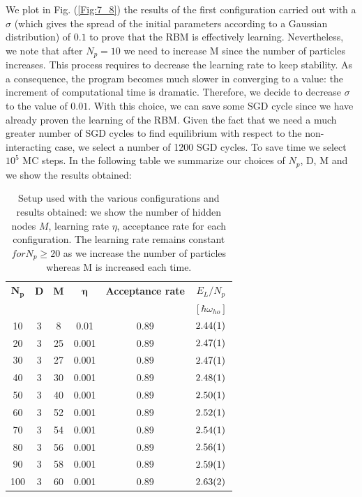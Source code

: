 We plot in Fig. (\ref{Fig:7_8}) the results of the first configuration carried out with a $\sigma$ (which gives the spread of the initial parameters according to a Gaussian distribution) of $0.1$ to prove that the RBM is effectively learning. Nevertheless, we note that after $N_p=10$ we need to increase M since the number of particles increases. This process requires to decrease the learning rate to keep stability. As a consequence, the program becomes much slower in converging to a value: the increment of computational time is dramatic. Therefore, we decide to decrease $\sigma$ to the value of $0.01$. With this choice, we can save some SGD cycle since we have already proven the learning of the RBM. Given the fact that we need a much greater number of SGD cycles to find equilibrium with respect to the non-interacting case, we select a number of 1200 SGD cycles. To save time we select $10^5$ MC steps. In the following table we summarize our choices of $N_p$, D, M and we show the results obtained: 


\begin{table}[H]
	\centering
	\caption{Setup used with the various configurations and results obtained: we show the number of hidden nodes $M$, learning rate $\eta$, acceptance rate for each configuration. The learning rate remains constant $for N_p\geq 20$ as we increase the number of particles whereas M is increased each time. }
	\begin{tabular}{c c |c c c | c} 
		$\boldsymbol{N_p}$ & \textbf{D}  & \textbf{M} & $\boldsymbol{\eta}$ & \textbf{Acceptance rate} &\textbf{$E_L/N_p$}\\  
		&&&&&$[\hbar\omega_{ho}]$\\\hline
		10 & 3 & 8 & 0.01  & 0.89 & $\SI{2.44\pm 0.01}{}$ \\
		20 & 3 & 25 & 0.001 & 0.89 & $\SI{2.47\pm 0.01}{}$\\
		30 & 3 & 27 & 0.001 & 0.89 & $\SI{2.47\pm 0.01}{}$\\
		40 & 3 & 30 & 0.001 & 0.89 & $\SI{2.48\pm 0.01}{}$\\
		50 & 3 & 40 & 0.001 & 0.89 & $\SI{2.50 \pm 0.01}{}$\\ 
		60 & 3 & 52 & 0.001 & 0.89     & $\SI{2.52 \pm 0.01}{}$               \\
		70 & 3 & 54 & 0.001 &  0.89    &       $\SI{2.54\pm0.01}{}$         \\
		80 & 3 & 56 & 0.001 &   0.89   &  $\SI{2.56\pm0.01}{}$              \\
		90 & 3 & 58 & 0.001 &    0.89  &  $\SI{2.59\pm0.01}{}$              \\
		100 & 3 & 60 &  0.001   &  0.89     &    $\SI{2.63\pm 0.02}{}$           \\
	\end{tabular}
	\label{Tab:4}
\end{table} 

